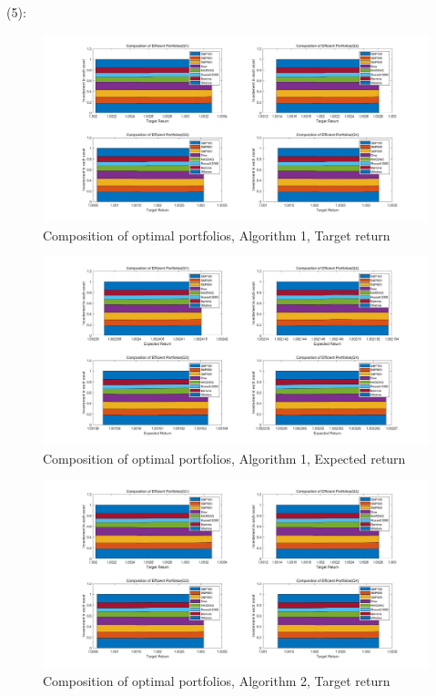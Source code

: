 \documentclass[11pt,a4paper]{article}
\begin{document}
(5):
\begin{figure}[H] 
	\centering 
	\includegraphics[width=1\textwidth]{51.jpg} %
	\caption{Composition of optimal portfolios, Algorithm 1, Target return} 
	\label{Fig.main4} 
\end{figure}
\begin{figure}[H] 
	\centering 
	\includegraphics[width=1\textwidth]{52.jpg} %
	\caption{Composition of optimal portfolios, Algorithm 1, Expected return} 
	\label{Fig.main5} 
\end{figure}
\begin{figure}[H] 
	\centering 
	\includegraphics[width=1\textwidth]{53.jpg} %
	\caption{Composition of optimal portfolios, Algorithm 2, Target return} 
	\label{Fig.main6} 
\end{figure}
\end{document}
